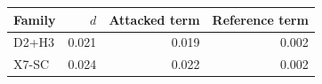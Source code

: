 \begin{tabular}{@{}lrrr@{}}\toprule
Family & $d$ & Attacked term & Reference term \\\midrule
D2+H3 & 0.021 & 0.019 & 0.002 \\
X7-SC & 0.024 & 0.022 & 0.002 \\
\bottomrule\end{tabular}
